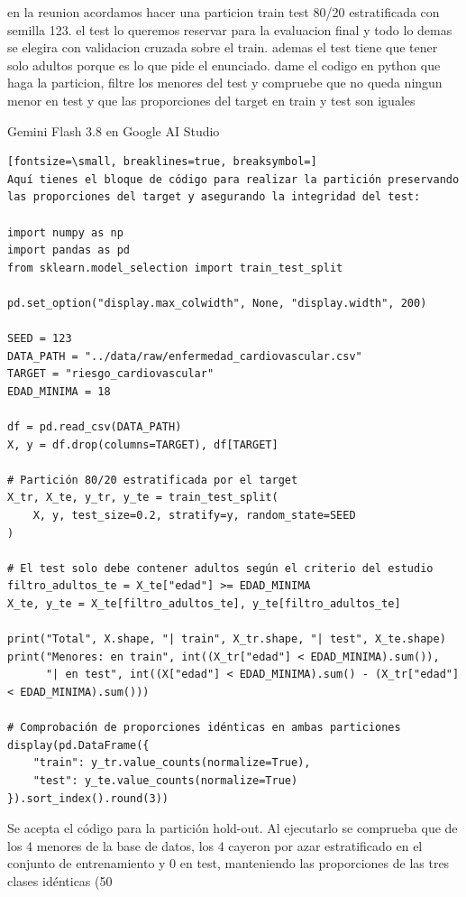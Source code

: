 \documentclass[12pt,a4paper,oneside]{book}
\begin{document}
\begin{iaprompt}
en la reunion acordamos hacer una particion train test 80/20 estratificada con semilla 123. el test lo queremos reservar para la evaluacion final y todo lo demas se elegira con validacion cruzada sobre el train. ademas el test tiene que tener solo adultos porque es lo que pide el enunciado. dame el codigo en python que haga la particion, filtre los menores del test y compruebe que no queda ningun menor en test y que las proporciones del target en train y test son iguales
\end{iaprompt}
\begin{iaresp}{Gemini Flash 3.8 en Google AI Studio}
\begin{Verbatim}[fontsize=\small, breaklines=true, breaksymbol=]
Aquí tienes el bloque de código para realizar la partición preservando las proporciones del target y asegurando la integridad del test:

import numpy as np
import pandas as pd
from sklearn.model_selection import train_test_split

pd.set_option("display.max_colwidth", None, "display.width", 200)

SEED = 123
DATA_PATH = "../data/raw/enfermedad_cardiovascular.csv"
TARGET = "riesgo_cardiovascular"
EDAD_MINIMA = 18

df = pd.read_csv(DATA_PATH)
X, y = df.drop(columns=TARGET), df[TARGET]

# Partición 80/20 estratificada por el target
X_tr, X_te, y_tr, y_te = train_test_split(
    X, y, test_size=0.2, stratify=y, random_state=SEED
)

# El test solo debe contener adultos según el criterio del estudio
filtro_adultos_te = X_te["edad"] >= EDAD_MINIMA
X_te, y_te = X_te[filtro_adultos_te], y_te[filtro_adultos_te]

print("Total", X.shape, "| train", X_tr.shape, "| test", X_te.shape)
print("Menores: en train", int((X_tr["edad"] < EDAD_MINIMA).sum()), 
      "| en test", int((X["edad"] < EDAD_MINIMA).sum() - (X_tr["edad"] < EDAD_MINIMA).sum()))

# Comprobación de proporciones idénticas en ambas particiones
display(pd.DataFrame({
    "train": y_tr.value_counts(normalize=True), 
    "test": y_te.value_counts(normalize=True)
}).sort_index().round(3))
\end{Verbatim}
\end{iaresp}
\begin{iaanalisis}
Se acepta el código para la partición hold-out. Al ejecutarlo se comprueba que de los 4 menores de la base de datos, los 4 cayeron por azar estratificado en el conjunto de entrenamiento y 0 en test, manteniendo las proporciones de las tres clases idénticas (50%
\end{iaanalisis}
\end{document}
